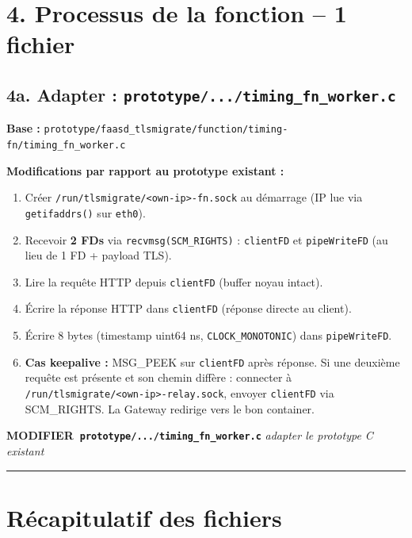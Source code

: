 \documentclass[11pt,a4paper]{article}
\newcommand{\act}[3]{%
  \vspace{0.2em}
  \noindent\colorbox{actionbg}{\parbox{\dimexpr\linewidth-2\fboxsep\relax}{%
    \small\textbf{#1~\texttt{#2}} \hfill \textit{\small #3}\\[-0.3em]
  }}
  \vspace{0.2em}
}
\begin{document}
\section*{4. Processus de la fonction -- 1 fichier}

\subsection*{4a. Adapter : \texttt{prototype/.../timing\_fn\_worker.c}}

\textbf{Base :} \texttt{prototype/faasd\_tlsmigrate/function/timing-fn/timing\_fn\_worker.c}

\textbf{Modifications par rapport au prototype existant :}
\begin{enumerate}[noitemsep]
  \item Créer \texttt{/run/tlsmigrate/<own-ip>-fn.sock} au démarrage
    (IP lue via \texttt{getifaddrs()} sur \texttt{eth0}).
  \item Recevoir \textbf{2 FDs} via \texttt{recvmsg(SCM\_RIGHTS)} : \texttt{clientFD}
    et \texttt{pipeWriteFD} (au lieu de 1 FD + payload TLS).
  \item Lire la requête HTTP depuis \texttt{clientFD} (buffer noyau intact).
  \item Écrire la réponse HTTP dans \texttt{clientFD} (réponse directe au client).
  \item Écrire 8 bytes (timestamp uint64 ns, \texttt{CLOCK\_MONOTONIC}) dans
    \texttt{pipeWriteFD}.
  \item \textbf{Cas keepalive :} MSG\_PEEK sur \texttt{clientFD} après réponse. Si une
    deuxième requête est présente et son chemin diffère : connecter à
    \texttt{/run/tlsmigrate/<own-ip>-relay.sock}, envoyer \texttt{clientFD} via
    SCM\_RIGHTS. La Gateway redirige vers le bon container.
\end{enumerate}

\act{MODIFIER}{prototype/.../timing\_fn\_worker.c}{adapter le prototype C existant}

\bigskip\hrule\bigskip

\section*{Récapitulatif des fichiers}
\end{document}
